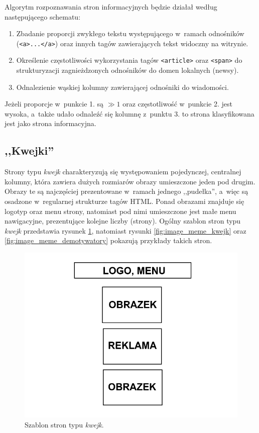 \documentclass[a4paper,10pt]{article}
\begin{document}
Algorytm rozpoznawania stron informacyjnych będzie działał według następującego schematu:

\begin{enumerate}
 \item Zbadanie proporcji zwykłego tekstu występującego w~ramach odnośników (\verb+<a>...</a>+) oraz innych tagów zawierających tekst widoczny na witrynie.
 \item Określenie częstotliwości wykorzystania tagów \verb+<article>+ oraz \verb+<span>+ do strukturyzacji zagnieżdzonych odnośników do domen lokalnych (newsy).
 \item Odnalezienie wąskiej kolumny zawierającej odnośniki do wiadomości.
\end{enumerate}

Jeżeli proporcje w~punkcie 1. są $\gg 1$ oraz częstotliwość w~punkcie 2. jest wysoka, a~także udało odnaleźć się kolumnę z~punktu 3. to strona klasyfikowana jest jako strona informacyjna.

\subsection*{,,Kwejki''}

Strony typu \emph{kwejk} charakteryzują się występowaniem pojedynczej, centralnej kolumny, która zawiera dużych rozmiarów obrazy umieszczone jeden pod drugim. Obrazy te są najczęściej prezentowane w~ramach jednego ,,pudełka'', a~więc są osadzone w~regularnej strukturze tagów HTML. Ponad obrazami znajduje się logotyp oraz menu strony, natomiast pod nimi umieszczone jest małe menu nawigacyjne, prezentujące kolejne liczby (strony). Ogólny szablon stron typu \emph{kwejk} przedstawia rysunek \ref{fig:image_meme_template}, natomiast rysunki \ref{fig:image_meme_kwejk} oraz \ref{fig:image_meme_demotywatory} pokazują przykłady takich stron.

\begin{figure}[h!]
\centering
  \includegraphics[width=.5\textwidth]{image_meme_template.png}
  \caption{Szablon stron typu \emph{kwejk}.}
  \label{fig:image_meme_template}
\end{figure}
\end{document}
